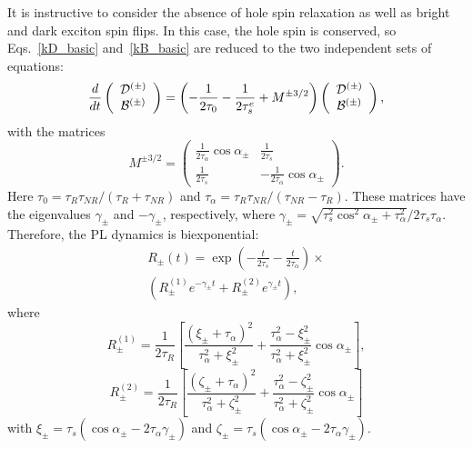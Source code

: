 \documentclass[twocolumn,showpacs,preprintnumbers,amsmath,amssymb,aps]{revtex4-1}
\begin{document}
It is instructive to consider the absence of hole spin relaxation as
well as bright and dark exciton spin flips. In this case, the hole
spin is conserved, so Eqs.~\eqref{kD_basic} and~\eqref{kB_basic} are
reduced to the two independent sets of equations:
\begin{equation}\label{init}
\frac{d}{dt} \left( \begin{array}{c} {\cal D}^{(\pm)} \\ {\cal B}^{(\pm)}\end{array} \right)
= \left(-\frac{1}{2\tau_0} -\frac{1}{2\tau_s^e} + M^{\pm 3/2}\right)
 \left( \begin{array}{c} {\cal D}^{(\pm)} \\ {\cal B}^{(\pm)}\end{array} \right),
\end{equation}
with the matrices
\begin{equation}
M^{\pm 3/2} = \left(
\begin{array}{cc}
\frac{1}{2\tau_\alpha} \cos\alpha_{\pm}  & \frac{1}{2\tau_s} \\
 \frac{1}{2\tau_s} & -\frac{1}{2\tau_\alpha} \cos\alpha_{\pm}
\end{array}
\right).
\end{equation}
Here $\tau_0 = \tau_R\tau_{NR}/(\tau_R + \tau_{NR})$ and $\tau_\alpha = \tau_R\tau_{NR}/(\tau_{NR} - \tau_{R})$. These matrices have the eigenvalues $\gamma_{\pm}$ and $-\gamma_{\pm}$, respectively, where $\gamma_{\pm} = \sqrt{\tau_s^2 \cos^2\alpha_{\pm} + \tau_\alpha^2}/2\tau_s \tau_\alpha$. Therefore, the PL dynamics is biexponential:
\begin{multline} \label{2LS-int}
R_{\pm}(t) = \exp\left(-\frac{t}{2\tau_s} - \frac{t}{2\tau_\alpha}\right)\times \\
\left(R_\pm^{(1)} e^{-\gamma_\pm t} + R_\pm^{(2)} e^{\gamma_\pm t}\right),
\end{multline}
where
\begin{equation}
R_\pm^{(1)} = \frac{1}{2\tau_R} \left[
\frac{(\xi_\pm + \tau_\alpha)^2 }{\tau_\alpha^2 + \xi_\pm^2} +
\frac{\tau_\alpha^2 - \xi_\pm^2 }{\tau_\alpha^2 + \xi_\pm^2} \cos\alpha_\pm
\right],
\end{equation}
\begin{equation}
R_\pm^{(2)} = \frac{1}{2\tau_R} \left[
\frac{(\zeta_\pm + \tau_\alpha)^2 }{\tau_\alpha^2 + \zeta_\pm^2} +
\frac{\tau_\alpha^2 - \zeta_\pm^2 }{\tau_\alpha^2 + \zeta_\pm^2} \cos\alpha_\pm
\right]
\end{equation}
with $\xi_\pm = \tau_s(\cos\alpha_{\pm} - 2\tau_\alpha \gamma_\pm)$ and $\zeta_\pm = \tau_s(\cos\alpha_{\pm} - 2\tau_\alpha \gamma_\pm)$.
\end{document}
